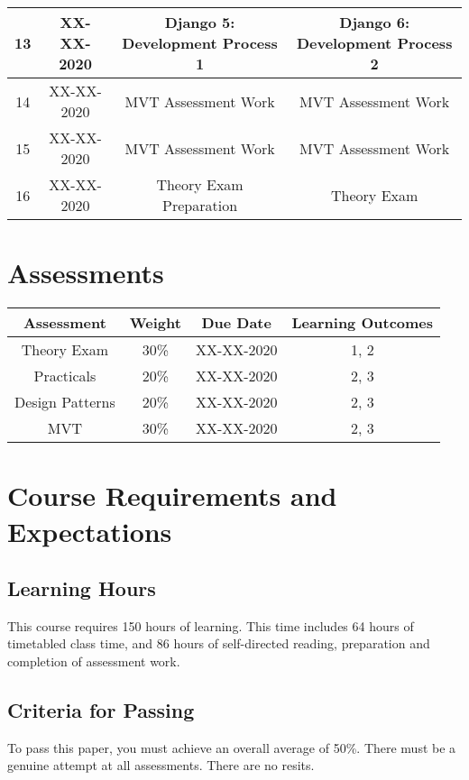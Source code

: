 \documentclass{article}
\begin{document}
\begin{tabular}{|c|c|c|c|}
	13            & XX-XX-2020    & Django 5: Development Process 1     & Django 6: Development Process 2 \\ \hline
	14            & XX-XX-2020    & MVT Assessment Work                 & MVT Assessment Work             \\ \hline
	15            & XX-XX-2020    & MVT Assessment Work                 & MVT Assessment Work             \\ \hline
	16            & XX-XX-2020    & Theory Exam Preparation             & Theory Exam                     \\ \hline
\end{tabular}

\section*{Assessments}
\renewcommand{\arraystretch}{1.5}
\begin{tabular}{|c|c|c|c|}
	\hline
	\textbf{Assessment} & \textbf{Weight} & \textbf{Due Date} & \textbf{Learning Outcomes} \\ \hline
	Theory Exam         & 30\%            & XX-XX-2020        & 1, 2                       \\ \hline
	Practicals          & 20\%            & XX-XX-2020        & 2, 3                       \\ \hline
	Design Patterns     & 20\%            & XX-XX-2020        & 2, 3                       \\ \hline
	MVT                 & 30\%            & XX-XX-2020        & 2, 3                       \\ \hline
			
\end{tabular}

\section*{Course Requirements and Expectations}

\subsection*{Learning Hours}
This course requires 150 hours of learning. This time includes 64 hours of timetabled class time, and 86 hours of self-directed reading, preparation and completion of assessment work.

\subsection*{Criteria for Passing}
To pass this paper, you must achieve an overall average of 50\%. There must be a genuine attempt at all assessments. There are no resits.
\end{document}

